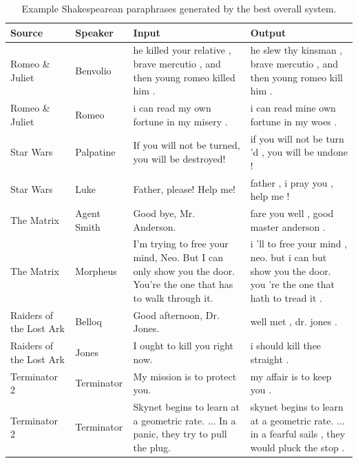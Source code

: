 \documentclass[10pt,a5paper,twoside]{article}
\begin{document}
\begin{table}[ht]
  \begin{center}
    \begin{tabular}{|l|l|p{1.4in}|p{1.4in}|}
      \hline
      Source & Speaker & Input & Output \\
      \hline
      \hline
      Romeo \& Juliet & Benvolio & he killed your relative , brave mercutio , and then young romeo killed him . & he slew thy kinsman , brave mercutio , and then young romeo kill him . \\
      \hline
      Romeo \& Juliet & Romeo & i can read my own fortune in my misery . & i can read mine own fortune in my woes . \\
      \hline
      Star Wars & Palpatine & If you will not be turned, you will be destroyed! & if you will not be turn 'd , you will be undone ! \\
      \hline
      Star Wars & Luke & Father, please! Help me! & father , i pray you , help me ! \\    
      \hline
      The Matrix & Agent Smith & Good bye, Mr. Anderson. & fare you well , good master anderson . \\
      \hline
      The Matrix & Morpheus & I'm trying to free your mind, Neo. But I can only show you the door. You're the one that has to walk through it. & i 'll to free your mind , neo. but i can but show you the door. you 're the one that hath to tread it . \\
      \hline
      Raiders of the Lost Ark & Belloq & Good afternoon, Dr. Jones. & well met , dr. jones . \\
      \hline
      Raiders of the Lost Ark & Jones & I ought to kill you right now. & i should kill thee straight . \\
      \hline
      Terminator 2 & Terminator & My mission is to protect you. & my affair is to keep you . \\
      \hline
      Terminator 2 & Terminator & Skynet begins to learn at a geometric rate. ... In a panic, they try to pull the plug. & skynet begins to learn at a geometric rate. ... in a fearful sails , they would pluck the stop . \\
      \hline
    \end{tabular}
  \end{center}
  \caption{Example Shakespearean paraphrases generated by the best overall system.}
  \label{examples}
\end{table}
\end{document}
